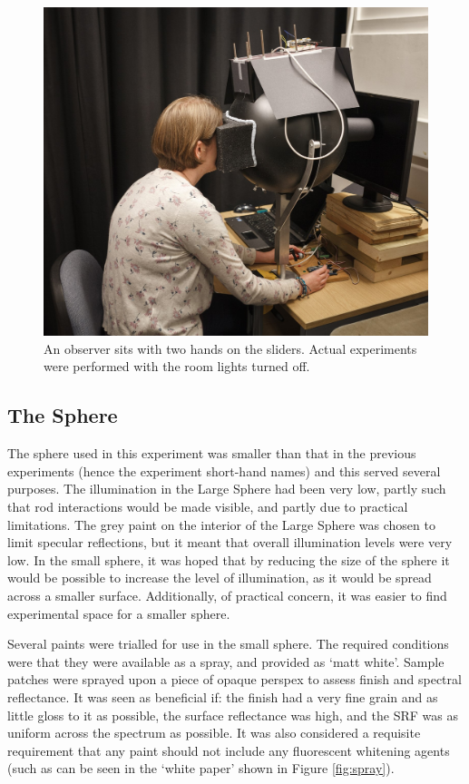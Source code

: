 \begin{figure}[htbp]
\includegraphics[max width=\textwidth,center]{figs/SmallSphere/SSphoto.jpg}
\caption{An observer sits with two hands on the sliders. Actual experiments were performed with the room lights turned off.}
\label{fig:SSphoto}
\end{figure}

\subsection{The Sphere}

The sphere used in this experiment was smaller than that in the previous experiments (hence the experiment short-hand names) and this served several purposes. The illumination in the Large Sphere had been very low, partly such that rod interactions would be made visible, and partly due to practical limitations. The grey paint on the interior of the Large Sphere was chosen to limit specular reflections, but it meant that overall illumination levels were very low. In the small sphere, it was hoped that by reducing the size of the sphere it would be possible to increase the level of illumination, as it would be spread across a smaller surface. Additionally, of practical concern, it was easier to find experimental space for a smaller sphere.

Several paints were trialled for use in the small sphere. The required conditions were that they were available as a spray, and provided as `matt white'. Sample patches were sprayed upon a piece of opaque perspex to assess finish and spectral reflectance. It was seen as beneficial if: the finish had a very fine grain and as little gloss to it as possible, the surface reflectance was high, and the \gls{SRF} was as uniform across the spectrum as possible. It was also considered a requisite requirement that any paint should not include any fluorescent whitening agents (such as can be seen in the `white paper' shown in Figure \ref{fig:spray}).

